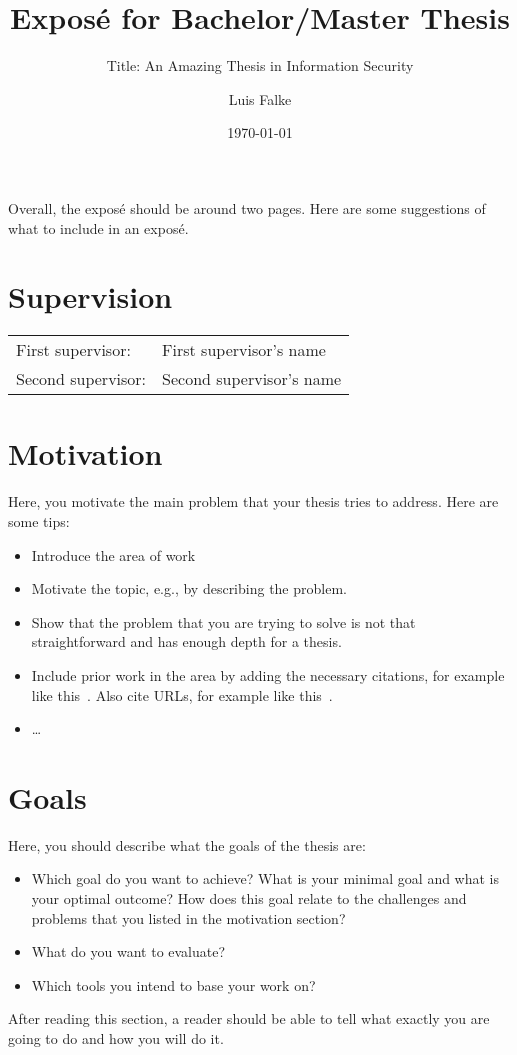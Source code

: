 \documentclass{scrartcl}
\title{Exposé for Bachelor/Master Thesis}
\subtitle{Title: An Amazing Thesis in Information Security}
\author{Luis Falke}
\date{\today}
\begin{document}
\maketitle

Overall, the exposé should be around two pages. Here are some suggestions of what to include in an exposé.


\section*{Supervision}


\begin{tabular}{ll}
	First supervisor:  & First supervisor's name  \\
	Second supervisor: & Second supervisor's name \\
\end{tabular}


\section*{Motivation}

Here, you motivate the main problem that your thesis tries to address. Here are some tips:
\begin{itemize}
	\item Introduce the area of work
	\item Motivate the  topic, e.g., by describing the problem.
	\item Show that the problem that you are trying to solve is not that straightforward and has enough depth for a thesis.
	\item Include prior work in the area by adding the necessary citations, for example like this~\cite{Shannon48}. Also cite URLs, for example like this~\cite{url}.
	\item \ldots
\end{itemize}




\section*{Goals}

Here, you should describe what the goals of the thesis are:

\begin{itemize}
	\item Which goal do you want to achieve? What is your minimal goal and what is your optimal outcome? How does this goal relate to the challenges and problems that you listed in the motivation section?
	\item What do you want to evaluate?
	\item Which tools you intend to base your work on?
\end{itemize}

After reading this section, a reader should be able to tell what exactly you are going to do and how you will do it.



\end{document}
